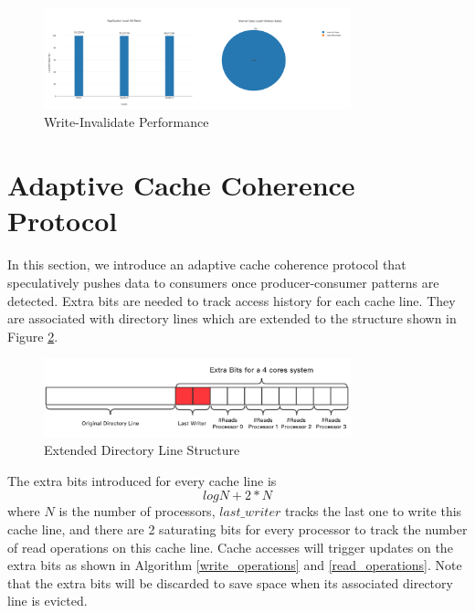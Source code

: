 \documentclass[conference]{IEEEtran}
\begin{document}
\begin{figure}[!h]
\centering
\includegraphics[width=3.5in]{write_update.png}
\caption{Write-Invalidate Performance}
\label{write_update}
\end{figure}
\FloatBarrier

\section{Adaptive Cache Coherence Protocol}
In this section, we introduce an adaptive cache coherence protocol that speculatively pushes data to consumers once producer-consumer patterns are detected. Extra bits are needed to track access history for each cache line. They are associated with directory lines which are extended to the structure shown in Figure \ref{dir_line}.

\begin{figure}[!h]
\centering
\captionsetup{justification=centering}
\includegraphics[width=3.5in]{dir_line.png}
\caption{Extended Directory Line Structure}
\label{dir_line}
\end{figure}
\FloatBarrier

The extra bits introduced for every cache line is
\begin{equation*}
log N + 2 * N
\end{equation*}
where $N$ is the number of processors, $last\_writer$ tracks the last one to write this cache line, and there are 2 saturating bits for every processor to track the number of read operations on this cache line. Cache accesses will trigger updates on the extra bits as shown in Algorithm \ref{write_operations} and \ref{read_operations}. Note that the extra bits will be discarded to save space when its associated directory line is evicted.
\end{document}

